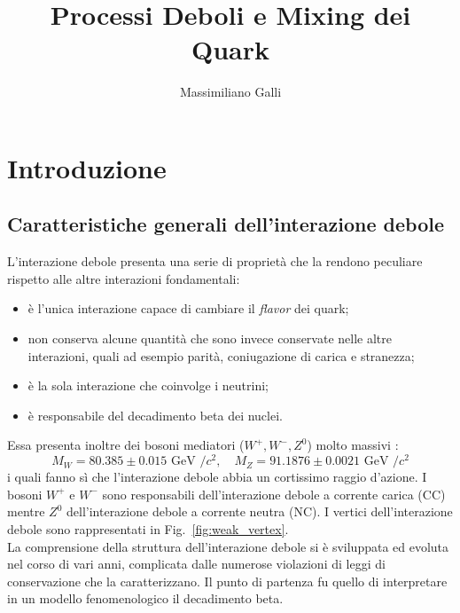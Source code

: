 \documentclass{subnucbo}
\title{Processi Deboli e Mixing dei Quark}
\author{Massimiliano Galli}
\begin{document}
\maketitle

\begin{abstract}
\end{abstract}

\section{Introduzione}
\subsection{Caratteristiche generali dell'interazione debole}
L'interazione debole presenta una serie di proprietà che la rendono peculiare rispetto alle altre interazioni fondamentali:
\begin{itemize}
        \item è l'unica interazione capace di cambiare il \textit{flavor} dei quark;
        \item non conserva alcune quantità che sono invece conservate nelle altre interazioni, quali ad esempio parità, coniugazione di carica e stranezza;
        \item è la sola interazione che coinvolge i neutrini;
        \item è responsabile del decadimento beta dei nuclei.
\end{itemize}
Essa presenta inoltre dei bosoni mediatori ($W^{+}, W^{-}, Z^{0}$) molto massivi \cite{ref:PDG}:
\begin{equation}
        M _ { W } = 80.385 \pm 0.015 \text { GeV } / c ^ { 2 } , \quad M _ { Z } = 91.1876 \pm 0.0021 \text { GeV } / c ^ { 2 }
        \label{eq:bosons_masses}
\end{equation}
i quali fanno sì che l'interazione debole abbia un cortissimo raggio d'azione. I bosoni $W^{+}$ e $W^{-}$ sono responsabili dell'interazione debole a corrente carica (CC) mentre $Z^{0}$ dell'interazione debole a corrente neutra (NC). I vertici dell'interazione debole sono rappresentati in Fig.~\ref{fig:weak_vertex}. \\
La comprensione della struttura dell'interazione debole si è sviluppata ed evoluta nel corso di vari anni, complicata dalle numerose violazioni di leggi di conservazione che la caratterizzano. Il punto di partenza fu quello di interpretare in un modello fenomenologico il decadimento beta.
\end{document}
